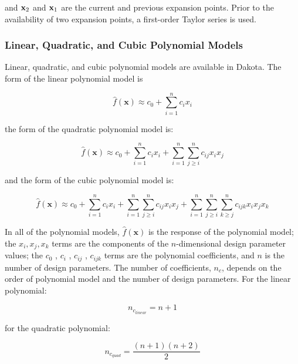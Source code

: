 and ${\bf x}_2$ and ${\bf x}_1$ are the current and previous expansion
points.  Prior to the availability of two expansion points, a
first-order Taylor series is used.

\subsubsection{Linear, Quadratic, and Cubic Polynomial Models}\label{models:surf:polynomial}

Linear, quadratic, and cubic polynomial models are available in
Dakota. The form of the linear polynomial model is

\begin{equation}
  \hat{f}(\mathbf{x}) \approx c_{0}+\sum_{i=1}^{n}c_{i}x_{i}
  \label{models:surf:equation01}
\end{equation}

the form of the quadratic polynomial model is:

\begin{equation}
  \hat{f}(\mathbf{x}) \approx c_{0}+\sum_{i=1}^{n}c_{i}x_{i}
  +\sum_{i=1}^{n}\sum_{j \ge i}^{n}c_{ij}x_{i}x_{j}
  \label{models:surf:equation02}
\end{equation}

and the form of the cubic polynomial model is:

\begin{equation}
  \hat{f}(\mathbf{x}) \approx c_{0}+\sum_{i=1}^{n}c_{i}x_{i}
  +\sum_{i=1}^{n}\sum_{j \ge i}^{n}c_{ij}x_{i}x_{j}
  +\sum_{i=1}^{n}\sum_{j \ge i}^{n}\sum_{k \ge j}^{n}
  c_{ijk}x_{i}x_{j}x_{k}
  \label{models:surf:equation03}
\end{equation}

In all of the polynomial models, $\hat{f}(\mathbf{x})$ is the response
of the polynomial model; the $x_{i},x_{j},x_{k}$ terms are the
components of the $n$-dimensional design parameter values; the $c_{0}$
, $c_{i}$ , $c_{ij}$ , $c_{ijk} $ terms are the polynomial
coefficients, and $n$ is the number of design parameters.  The number
of coefficients, $n_{c}$, depends on the order of polynomial model and
the number of design parameters. For the linear polynomial:

\begin{equation}
  n_{c_{linear}}=n+1
  \label{models:surf:equation04}
\end{equation}

for the quadratic polynomial:

\begin{equation}
  n_{c_{quad}}=\frac{(n+1)(n+2)}{2}
  \label{models:surf:equation05}
\end{equation}

